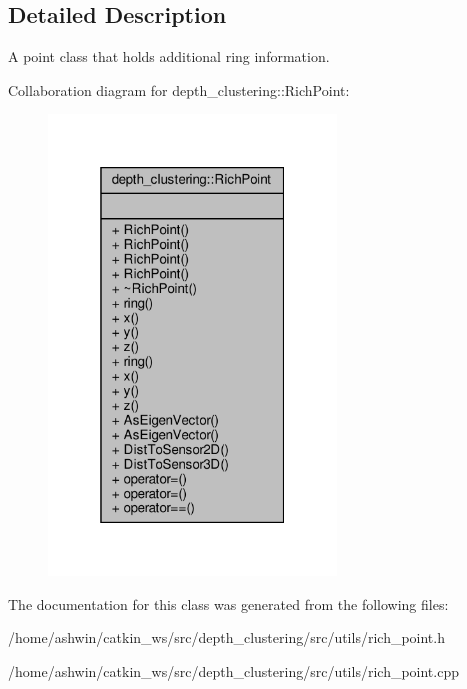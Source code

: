 \subsection{Detailed Description}
A point class that holds additional ring information. 

Collaboration diagram for depth\+\_\+clustering\+:\+:Rich\+Point\+:\nopagebreak
\begin{figure}[H]
\begin{center}
\leavevmode
\includegraphics[width=217pt]{classdepth__clustering_1_1RichPoint__coll__graph}
\end{center}
\end{figure}


The documentation for this class was generated from the following files\+:\begin{DoxyCompactItemize}
\item 
/home/ashwin/catkin\+\_\+ws/src/depth\+\_\+clustering/src/utils/rich\+\_\+point.\+h\item 
/home/ashwin/catkin\+\_\+ws/src/depth\+\_\+clustering/src/utils/rich\+\_\+point.\+cpp\end{DoxyCompactItemize}
